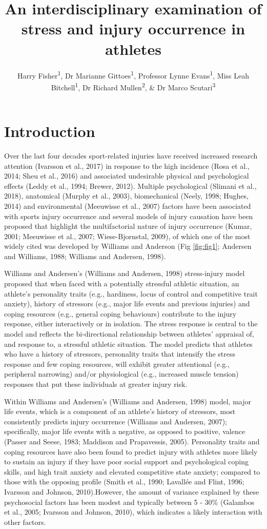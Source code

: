\documentclass[
  english,
  man]{apa6}
\author{Harry Fisher\textsuperscript{1}, Dr Marianne Gittoes\textsuperscript{1}, Professor Lynne Evans\textsuperscript{1}, Miss Leah Bitchell\textsuperscript{1}, Dr Richard Mullen\textsuperscript{2}, \& Dr Marco Scutari\textsuperscript{3}}
\affiliation{
\vspace{0.5cm}
\textsuperscript{1} Cardiff Metropolitan University, Cardiff, United Kingdom\\\textsuperscript{2} Brunel University, London, United Kingdom\\\textsuperscript{3} Istituto Dalle Molle di Studi sull'Intelligenza Artificiale (IDSIA), Manno, Switzerland}
\title{An interdisciplinary examination of stress and injury occurrence in athletes}
\date{}
\begin{document}
\maketitle

\section{Introduction}

Over the last four decades sport-related injuries have received increased research attention (Ivarsson et al., 2017) in response to the high incidence (Rosa et al., 2014; Sheu et al., 2016) and associated undesirable physical and psychological effects (Leddy et al., 1994; Brewer, 2012). Multiple psychological (Slimani et al., 2018), anatomical (Murphy et al., 2003), biomechanical (Neely, 1998; Hughes, 2014) and environmental (Meeuwisse et al., 2007) factors have been associated with sports injury occurrence and several models of injury causation have been proposed that highlight the multifactorial nature of injury occurrence (Kumar, 2001; Meeuwisse et al., 2007; Wiese-Bjornstal, 2009), of which one of the most widely cited was developed by Williams and Anderson (Fig \ref{fig:fig1}; Andersen and Williams, 1988; Williams and Andersen, 1998).

Williams and Andersen's (Williams and Andersen, 1998) stress-injury model proposed that when faced with a potentially stressful athletic situation, an athlete's personality traits (e.g., hardiness, locus of control and competitive trait anxiety), history of stressors (e.g., major life events and previous injuries) and coping resources (e.g., general coping behaviours) contribute to the injury response, either interactively or in isolation. The stress response is central to the model and reflects the bi-directional relationship between athletes' appraisal of, and response to, a stressful athletic situation. The model predicts that athletes who have a history of stressors, personality traits that intensify the stress response and few coping resources, will exhibit greater attentional (e.g., peripheral narrowing) and/or physiological (e.g., increased muscle tension) responses that put these individuals at greater injury risk.

Within Williams and Andersen's (Williams and Andersen, 1998) model, major life events, which is a component of an athlete's history of stressors, most consistently predicts injury occurrence (Williams and Andersen, 2007); specifically, major life events with a negative, as opposed to positive, valence (Passer and Seese, 1983; Maddison and Prapavessis, 2005). Personality traits and coping resources have also been found to predict injury with athletes more likely to sustain an injury if they have poor social support and psychological coping skills, and high trait anxiety and elevated competitive state anxiety; compared to those with the opposing profile (Smith et al., 1990; Lavallée and Flint, 1996; Ivarsson and Johnson, 2010).However, the amount of variance explained by these psychosocial factors has been modest and typically between 5 - 30\% (Galambos et al., 2005; Ivarsson and Johnson, 2010), which indicates a likely interaction with other factors.
\end{document}
